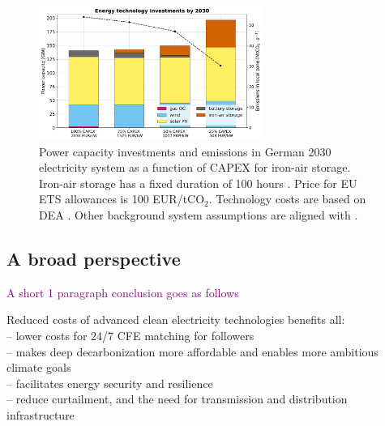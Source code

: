 \documentclass[pdflatex,sn-basic, Numbered]{sn-jnl}%
\theoremstyle{thmstyleone}%
\theoremstyle{thmstyletwo}%
\theoremstyle{thmstylethree}%
\newcommand{\comment}[1]{\textcolor{purple}{#1}}
\begin{document}
\begin{figure}
    \centering
    \includegraphics[width=0.65\textwidth]{images/dashboard_3.pdf}
    \caption{Power capacity investments and emissions in German 2030 electricity system as a function of CAPEX for iron-air storage. \\
    Iron-air storage has a fixed duration of 100 hours \cite{FormEnergyLatest2024}. Price for EU ETS allowances is 100 EUR/tCO$_2$. Technology costs are based on DEA \cite{DEA-technologydata}. Other background system assumptions are aligned with \citet{riepin-zenodo-systemlevel247}.}\label{fig:impact}
    \captionsetup{width=0.3\textwidth}  %
\end{figure}


\subsection*{A broad perspective}\label{sec4}

\comment{A short 1 paragraph conclusion goes as follows}

Reduced costs of advanced clean electricity technologies benefits all: \\
-- lower costs for 24/7 CFE matching for followers \\
-- makes deep decarbonization more affordable and enables more ambitious climate goals \\
-- facilitates energy security and resilience \\
-- reduce curtailment, and the need for transmission and distribution infrastructure \\


\end{document}
